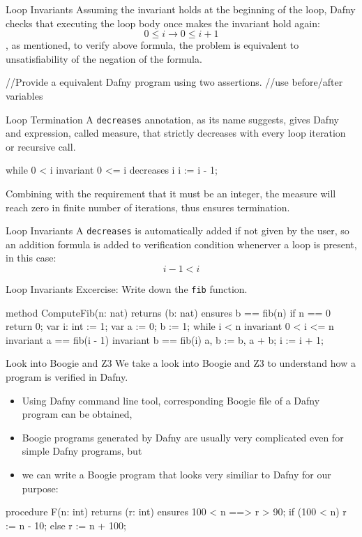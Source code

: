 \documentclass[10pt, compress]{beamer}
\begin{document}
\begin{frame}[fragile]{Loop Invariants}
Assuming the invariant holds at the beginning of the loop, Dafny checks that executing the loop body once makes the invariant hold again:
    $$0 \leq i \to 0 \leq i + 1$$
, as mentioned, to verify above formula, the problem is equivalent to unsatisfiability of the negation of the formula.

\end{frame}

//Provide a equivalent Dafny program using two assertions.
//use before/after variables
\begin{frame}[fragile]{Loop Termination}
A \verb|decreases| annotation, as its name suggests, gives Dafny and expression, called measure, that strictly decreases with every loop iteration or recursive call.
  \begin{verbnobox}[\footnotesize]
while 0 < i
   invariant 0 <= i
   decreases i
{
   i := i - 1;
}
  \end{verbnobox}
Combining with the requirement that it must be an integer, the measure will reach zero in finite number of iterations, thus ensures termination.
\end{frame}

\begin{frame}[fragile]{Loop Invariants}
A \verb|decreases| is automatically added if not given by the user, so an addition formula is added to verification condition whenerver a loop is present, in this case:
  $$i - 1 < i$$
\end{frame}

\begin{frame}[fragile]{Loop Invariants}
  Excercise: Write down the \verb|fib| function.
  \begin{verbnobox}[\footnotesize]
method ComputeFib(n: nat) returns (b: nat)
   ensures b == fib(n)
{
   if n == 0 { return 0; }
   var i: int := 1;
   var a := 0;
       b := 1;
   while i < n
      invariant 0 < i <= n
      invariant a == fib(i - 1)
      invariant b == fib(i)
   {
      a, b := b, a + b;
      i := i + 1;
   }
}
  \end{verbnobox}
\end{frame}

\begin{frame}[fragile]{Look into Boogie and Z3}
  We take a look into Boogie and Z3 to understand how a program is verified in Dafny.
  \begin{itemize}
  \item Using Dafny command line tool, corresponding Boogie file of a Dafny program can be obtained,
  \item Boogie programs generated by Dafny are usually very complicated even for simple Dafny programs, but
  \item we can write a Boogie program that looks very similiar to Dafny for our purpose:
  \end{itemize}
  \begin{verbnobox}[\footnotesize]
procedure F(n: int) returns (r: int)
  ensures 100 < n ==> r > 90;
{
  if (100 < n) {
    r := n - 10;
  } else {
    r := n + 100;
  }
}
  \end{verbnobox}
\end{frame}
\end{document}

